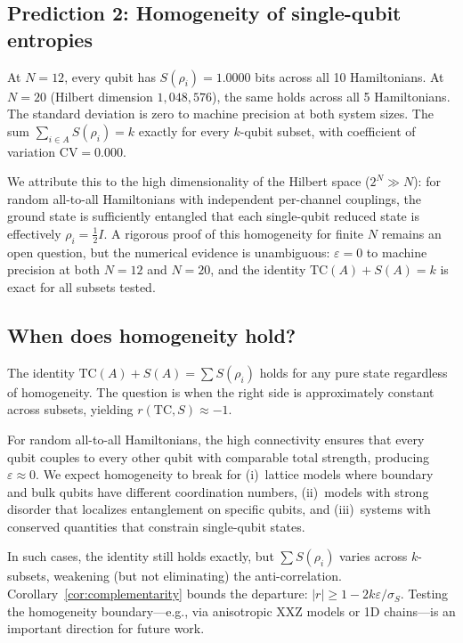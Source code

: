 \documentclass[aps,pra,twocolumn,superscriptaddress,floatfix]{revtex4-2}
\begin{document}
\subsection{Prediction 2: Homogeneity of single-qubit entropies}

At $N = 12$, every qubit has $S(\rho_i) = 1.0000$ bits
across all 10 Hamiltonians.  At $N = 20$
(Hilbert dimension $1{,}048{,}576$), the same holds
across all 5 Hamiltonians.
The standard deviation is zero to machine precision
at both system sizes.
The sum $\sum_{i \in A} S(\rho_i) = k$ exactly
for every $k$-qubit subset, with coefficient of variation
$\mathrm{CV} = 0.000$.

We attribute this to the high dimensionality of the
Hilbert space ($2^N \gg N$): for random all-to-all
Hamiltonians with independent per-channel couplings,
the ground state is sufficiently entangled that each
single-qubit reduced state is effectively $\rho_i = \frac{1}{2}I$.
A rigorous proof of this homogeneity for finite $N$
remains an open question, but the numerical evidence
is unambiguous: $\varepsilon = 0$ to machine precision
at both $N = 12$ and $N = 20$, and the identity
$\mathrm{TC}(A) + S(A) = k$ is exact for all subsets tested.

\subsection{When does homogeneity hold?}

The identity $\mathrm{TC}(A) + S(A) = \sum S(\rho_i)$ holds
for any pure state regardless of homogeneity.
The question is when the right side is approximately constant
across subsets, yielding $r(\mathrm{TC}, S) \approx -1$.

For random all-to-all Hamiltonians, the high connectivity
ensures that every qubit couples to every other qubit with
comparable total strength, producing $\varepsilon \approx 0$.
We expect homogeneity to break for (i)~lattice models where
boundary and bulk qubits have different coordination numbers,
(ii)~models with strong disorder that localizes entanglement
on specific qubits, and (iii)~systems with conserved quantities
that constrain single-qubit states.

In such cases, the identity still holds exactly, but
$\sum S(\rho_i)$ varies across $k$-subsets, weakening
(but not eliminating) the anti-correlation.
Corollary~\ref{cor:complementarity} bounds the departure:
$|r| \geq 1 - 2k\varepsilon / \sigma_S$.
Testing the homogeneity boundary---e.g., via anisotropic
XXZ models or 1D chains---is an important direction
for future work.
\end{document}
